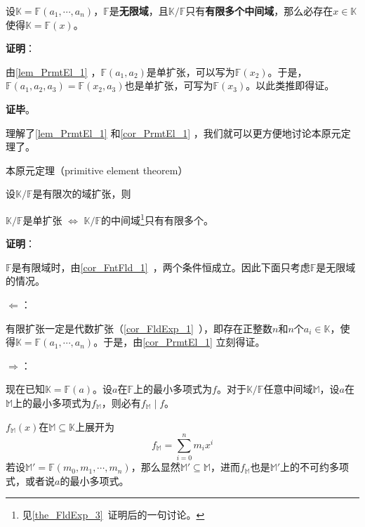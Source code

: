 \begin{corollary}{}\label{cor_PrmtEl_1}
设$\mathbb{K}=\mathbb{F}(a_1, \cdots, a_n)$，$\mathbb{F}$是\textbf{无限域}，且$\mathbb{K}/\mathbb{F}$只有\textbf{有限多个中间域}，那么必存在$x\in\mathbb{K}$使得$\mathbb{K}=\mathbb{F}(x)$。
\end{corollary}

\textbf{证明}：

由\autoref{lem_PrmtEl_1} ，$\mathbb{F}(a_1, a_2)$是单扩张，可以写为$\mathbb{F}(x_2)$。于是，$\mathbb{F}(a_1, a_2, a_3)=\mathbb{F}(x_2, a_3)$也是单扩张，可写为$\mathbb{F}(x_3)$。以此类推即得证。

\textbf{证毕}。


理解了\autoref{lem_PrmtEl_1} 和\autoref{cor_PrmtEl_1} ，我们就可以更方便地讨论本原元定理了。


\begin{theorem}{本原元定理（primitive element theorem）}\label{the_PrmtEl_1}

设$\mathbb{K}/\mathbb{F}$是有限次的域扩张，则

$\mathbb{K}/\mathbb{F}$是单扩张 $\iff$ $\mathbb{K}/\mathbb{F}$的中间域\footnote{见\autoref{the_FldExp_3}~证明后的一句讨论。}只有有限多个。

\end{theorem}

\textbf{证明}：

$\mathbb{F}$是有限域时，由\autoref{cor_FntFld_1}~，两个条件恒成立。因此下面只考虑$\mathbb{F}$是无限域的情况。

$\Leftarrow$：

有限扩张一定是代数扩张（\autoref{cor_FldExp_1}~），即存在正整数$n$和$n$个$a_i\in\mathbb{K}$，使得$\mathbb{K}=\mathbb{F}(a_1, \cdots, a_n)$。于是，由\autoref{cor_PrmtEl_1} 立刻得证。

$\Rightarrow$：

现在已知$\mathbb{K}=\mathbb{F}(a)$。设$a$在$\mathbb{F}$上的最小多项式为$f$。对于$\mathbb{K}/\mathbb{F}$任意中间域$\mathbb{M}$，设$a$在$\mathbb{M}$上的最小多项式为$f_\mathbb{M}$，则必有$f_{\mathbb{M}}\mid f$。

$f_\mathbb{M}(x)$在$\mathbb{M}\subseteq\mathbb{K}$上展开为
\begin{equation}
f_\mathbb{M} = \sum_{i=0}^n m_ix^i
\end{equation}
若设$\mathbb{M}'=\mathbb{F}(m_0, m_1, \cdots, m_n)$，那么显然$\mathbb{M}'\subseteq\mathbb{M}$，进而$f_\mathbb{M}$也是$\mathbb{M}'$上的不可约多项式，或者说$a$的最小多项式。

